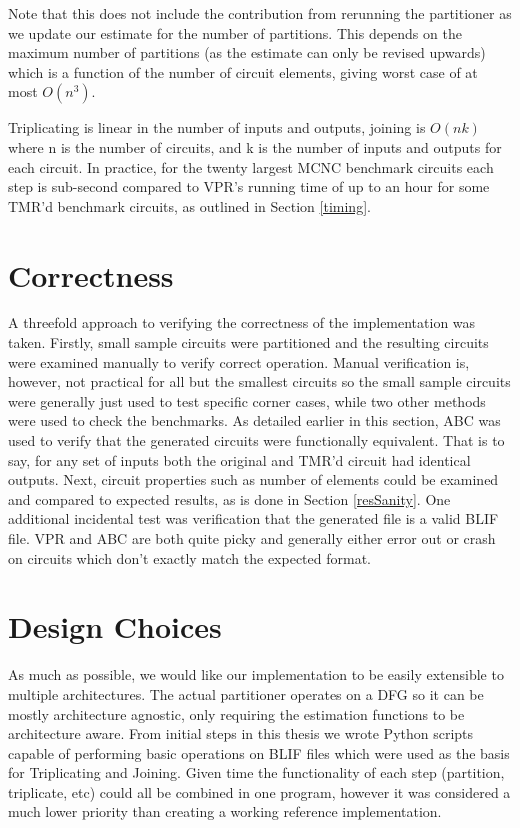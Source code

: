\documentclass[12pt,final,oneside]{dwThesis} %
\begin{document}
   Note that this does not include the contribution from rerunning the partitioner as we update our estimate for the number of partitions.
   This depends on the maximum number of partitions (as the estimate can only be revised upwards) which is a function of the number of circuit elements,
   giving worst case of at most $O(n^3)$. 
   
   
   Triplicating is linear in the number of
   inputs and outputs, joining is $O(nk)$ where n is the number of circuits,
   and k is the number of inputs and outputs for each circuit.  In practice, for the twenty
   largest \gls{MCNC} benchmark circuits each step is sub-second
   compared to \gls{VPR}'s running time of up to an hour for some \gls{TMR}'d
   benchmark circuits, as outlined in Section \ref{timing}.


   \section{Correctness}
   A threefold approach to verifying the correctness of
   the implementation was taken.  Firstly, small sample circuits were
   partitioned and the resulting circuits were examined manually to verify
   correct operation. Manual verification is, however, not practical for all
   but the smallest circuits so the small sample circuits were generally just
   used to test specific corner cases, while two other methods were used to
   check the benchmarks. As detailed earlier in this section, \gls{ABC} was
   used to verify that the generated circuits were functionally equivalent.
   That is to say, for any set of inputs both the original and TMR'd circuit
   had identical outputs.  Next, circuit properties such as number of elements
   could be examined and compared to expected results, as is done in Section
   \ref{resSanity}.  One additional incidental test was verification that the
   generated file is a valid \gls{BLIF} file. \gls{VPR} and \gls{ABC} are both
   quite picky and generally either error out or crash on circuits which don't
   exactly match the expected format.



   \section{Design Choices}
   As much as possible, we would like our
   implementation to be easily extensible to multiple architectures. The actual
   partitioner operates on a \gls{DFG} so it can be mostly architecture
   agnostic, only requiring the estimation functions to be architecture aware.
   From initial steps in this thesis we wrote Python scripts capable of
   performing basic operations on \gls{BLIF} files which were used as the basis
   for Triplicating and Joining. Given time the functionality of each step
   (partition, triplicate, etc) could all be combined in one program, however
   it was considered a much lower priority than creating a working reference
   implementation.
\end{document}
